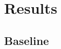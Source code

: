 %
\chapter{Results}
\label{sec:results}

\section{Baseline}
\label{sec:pipeline:baseline}
\citet{dalal_histograms_2005}
